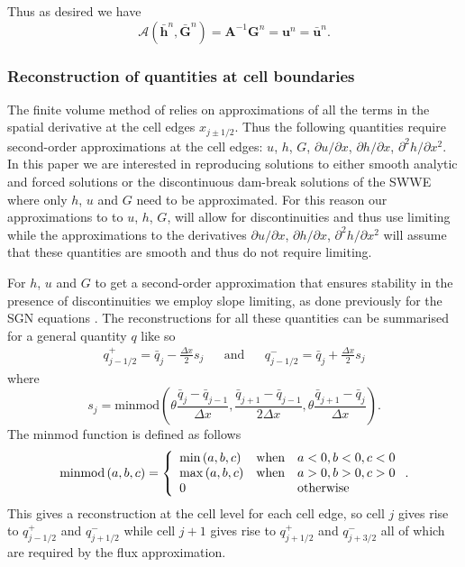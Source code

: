 \documentclass[10pt]{elsarticle}
\newcommand{\vecn}[1]{\boldsymbol{#1}}
\begin{document}
Thus as desired we have 
\begin{equation}
\mathcal{A}\left(\bar{\vecn{h}}^n,\bar{\vecn{G}}^n\right) = \vecn{A}^{-1} {\vecn{G}}^n = \vecn{u}^n = \bar{{\vecn{u}}}^n. 
\label{eq:A_secondord}
\end{equation}


\subsubsection{Reconstruction of quantities at cell boundaries}
The finite volume method of \citet{Kurganov-etal-2001-707} relies on approximations of all the terms in the spatial derivative at the cell edges $x_{j\pm1/2}$. Thus the following quantities require second-order approximations at the cell edges: $u$, $h$, $G$, $\partial u / \partial x$, $\partial h / \partial x$, $\partial^2 h / \partial x^2$. In this paper we are interested in reproducing solutions to either smooth analytic and forced solutions or the discontinuous dam-break solutions of the SWWE where only $h$, $u$ and $G$ need to be approximated. For this reason our approximations to to  $u$, $h$, $G$, will allow for discontinuities and thus use limiting while the approximations to the derivatives $\partial u / \partial x$, $\partial h / \partial x$, $\partial^2 h / \partial x^2$ will assume that these quantities are smooth and thus do not require limiting.

For $h$, $u$ and $G$ to get a second-order approximation that ensures stability in the presence of discontinuities we employ slope limiting, as done previously for the SGN equations \cite{Zoppou-etal-2017}. The reconstructions for all these quantities can be summarised for a general quantity $q$ like so
\begin{align}
q^+_{j-1/2} = \bar{q}_j - \frac{\Delta x}{2} s_j & & \text{and} & &
q^-_{j-1/2} = \bar{q}_j + \frac{\Delta x}{2} s_j
\end{align}
where
\begin{equation}
s_j = \text{minmod}\left(\theta \dfrac{\bar{q}_j - \bar{q}_{j-1}}{\Delta x},  \dfrac{\bar{q}_{j+1} - \bar{q}_{j-1}}{2\Delta x},\theta \dfrac{\bar{q}_{j+1} - \bar{q}_{j}}{\Delta x}\right).
\end{equation}
The minmod function is defined as follows
\begin{equation}
\text{minmod}\left(a,b,c\right) = \left\lbrace \begin{array}{l c l}
\min{\left(a,b,c\right)} & \text{when} & a<0, b<0, c<0 \\
\max{\left(a,b,c\right)} & \text{when} & a>0, b>0, c>0 \\
0 & & \text{otherwise}
\end{array} \right. . 
\end{equation}
This gives a reconstruction at the cell level for each cell edge, so cell $j$ gives rise to $q^+_{j-1/2}$ and $q^-_{j+1/2} $ while cell $j+1$ gives rise to $q^+_{j+1/2}$ and $q^-_{j+3/2}$ all of which are required by the flux approximation.
\end{document}
